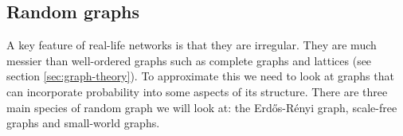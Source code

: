\subsection{Random graphs}
A key feature of real-life networks is that they are irregular. They are much messier than well-ordered graphs such as complete graphs and lattices (see section \ref{sec:graph-theory}). To approximate this we need to look at graphs that can incorporate probability into some aspects of its structure. There are three main species of random graph we will look at: the Erd\H{o}s-R{\'e}nyi graph, scale-free graphs and small-world graphs.
